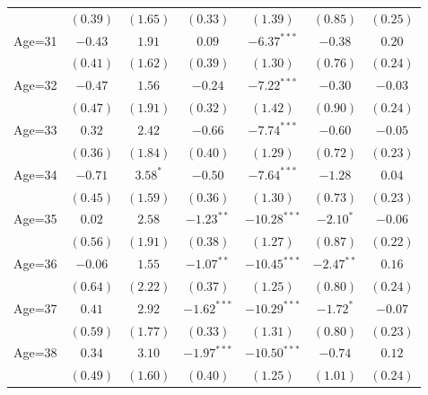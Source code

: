 \documentclass[fullpage]{paper}
\begin{document}
\begin{center}
\begin{longtable}{l c c c c c c }
            & $(0.39)$      & $(1.65)$      & $(0.33)$       & $(1.39)$       & $(0.85)$      & $(0.25)$      \\
Age=31      & $-0.43$       & $1.91$        & $0.09$         & $-6.37^{***}$  & $-0.38$       & $0.20$        \\
            & $(0.41)$      & $(1.62)$      & $(0.39)$       & $(1.30)$       & $(0.76)$      & $(0.24)$      \\
Age=32      & $-0.47$       & $1.56$        & $-0.24$        & $-7.22^{***}$  & $-0.30$       & $-0.03$       \\
            & $(0.47)$      & $(1.91)$      & $(0.32)$       & $(1.42)$       & $(0.90)$      & $(0.24)$      \\
Age=33      & $0.32$        & $2.42$        & $-0.66$        & $-7.74^{***}$  & $-0.60$       & $-0.05$       \\
            & $(0.36)$      & $(1.84)$      & $(0.40)$       & $(1.29)$       & $(0.72)$      & $(0.23)$      \\
Age=34      & $-0.71$       & $3.58^{*}$    & $-0.50$        & $-7.64^{***}$  & $-1.28$       & $0.04$        \\
            & $(0.45)$      & $(1.59)$      & $(0.36)$       & $(1.30)$       & $(0.73)$      & $(0.23)$      \\
Age=35      & $0.02$        & $2.58$        & $-1.23^{**}$   & $-10.28^{***}$ & $-2.10^{*}$   & $-0.06$       \\
            & $(0.56)$      & $(1.91)$      & $(0.38)$       & $(1.27)$       & $(0.87)$      & $(0.22)$      \\
Age=36      & $-0.06$       & $1.55$        & $-1.07^{**}$   & $-10.45^{***}$ & $-2.47^{**}$  & $0.16$        \\
            & $(0.64)$      & $(2.22)$      & $(0.37)$       & $(1.25)$       & $(0.80)$      & $(0.24)$      \\
Age=37      & $0.41$        & $2.92$        & $-1.62^{***}$  & $-10.29^{***}$ & $-1.72^{*}$   & $-0.07$       \\
            & $(0.59)$      & $(1.77)$      & $(0.33)$       & $(1.31)$       & $(0.80)$      & $(0.23)$      \\
Age=38      & $0.34$        & $3.10$        & $-1.97^{***}$  & $-10.50^{***}$ & $-0.74$       & $0.12$        \\
            & $(0.49)$      & $(1.60)$      & $(0.40)$       & $(1.25)$       & $(1.01)$      & $(0.24)$      \\

\end{longtable}
\end{center}
\end{document}
